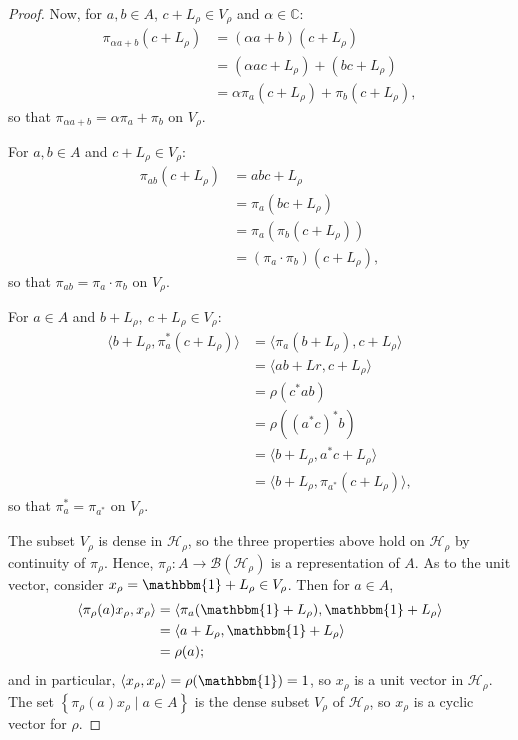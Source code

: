 \documentclass[11pt,a4paper]{report}
\theoremstyle{plain}
\theoremstyle{definition}
\newcommand{\1}{\mathbbm{1}}
\newcommand{\B}{\mathcal{B}}
\newcommand{\Hr}{\mathcal{H}_\rho}
\newcommand{\Vr}{V_\rho}
\newcommand{\Lr}{L_\rho}
\newcommand{\xr}{x_\rho}
\begin{document}
\begin{proof}
	
	Now, for $a,b \in A$, $c+ L_\rho \in \Vr$ and $\alpha \in \mathbb{C}$:
	\begin{align*}
				\pi_{\alpha a+b}(c+\Lr)
		&=		(\alpha a+b) (c+\Lr)													\\
		&=		(\alpha ac +\Lr) + (bc+\Lr)												\\
		&=		\alpha \pi_a (c+\Lr) + \pi_b(c+\Lr),
	\end{align*}
	so that $\pi_{\alpha a + b} = \alpha \pi_a +\pi_b$ on $\Vr$.
	
	For $a,b \in A$ and $c+ L_\rho \in \Vr$:
	\begin{align*}
		\pi_{ab}(c+\Lr)
		&=		abc+\Lr																	\\
		&=		\pi_a (bc+\Lr)															\\
		&=		\pi_a (\pi_b (c+\Lr))													\\
		&=		(\pi_a \cdot \pi_b) (c+\Lr),
	\end{align*}
	so that $\pi_{a b} = \pi_a \cdot \pi_b$ on $\Vr$.
	
	For $a\in A$ and $b+ L_\rho,~c+ L_\rho \in \Vr$:
	\begin{align*}
				\langle b+\Lr, \pi_a^\ast (c+\Lr) \rangle 
		&=		\langle \pi_a (b+\Lr), c+\Lr \rangle									\\
		&=		\langle ab +Lr, c+\Lr \rangle											\\
		&=		\rho(c^\ast ab)															\\
		&=		\rho((a^\ast c)^\ast b)													\\
		&=		\langle b+\Lr, a^\ast c+\Lr \rangle										\\
		&=		\langle b+\Lr, \pi_{a^\ast}(c+\Lr)\rangle,
	\end{align*}
	so that $ \pi_a^\ast = \pi_{a^\ast}$ on $\Vr$.
	
	The subset $\Vr$ is dense in $\Hr$, so the three properties above hold on $\Hr$ 
	by continuity of $\pi_\rho$. Hence, $\pi_\rho: A \to \B(\Hr)$ is a 
	representation of $A$. As to the unit vector, consider $\xr = \1 + \Lr \in \Vr$. 
	Then for $a \in A$,
	\begin{align*}
				\langle \pi_\rho(a)\xr ,\xr \rangle 
		&=		\langle \pi_a(\1+\Lr), \1+\Lr \rangle									\\
		&=		\langle a+\Lr, \1+\Lr \rangle											\\
		&=		\rho(a);
	\end{align*}
	and in particular, $\langle \xr,\xr \rangle = \rho (\1) = 1$, so $\xr$ is a unit 
	vector in $\Hr$. The set $\left\{\pi_\rho(a)x_\rho \mid a\in A\right\}$ is the 
	dense subset $\Vr$ of $\Hr$, so $x_\rho$ is a cyclic vector for $\rho$.


\end{proof}
\end{document}
